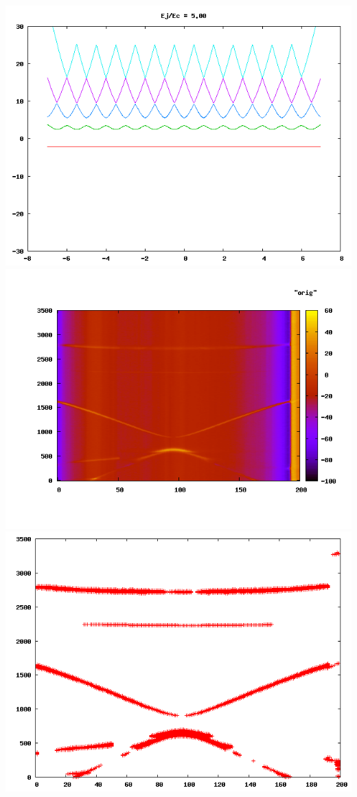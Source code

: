 \documentclass[12pt]{article}
\begin{document}
\begin{center}
\includegraphics[scale=0.33]{parabolas.png}\\
\includegraphics[scale=0.30]{orig.png}
\includegraphics[scale=0.30]{pic.png}
\end{center}
\end{document}

